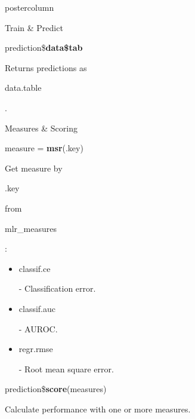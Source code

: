 \documentclass{beamer}
\newcommand{\codeinline}[1]{\begin{codeboxinline}#1\end{codeboxinline}}
\begin{document}
\begin{frame}[fragile]{}
\begin{columns}
\begin{column}{.245\textwidth}
\begin{beamercolorbox}[center]{postercolumn}
\begin{minipage}{.98\textwidth}
{\begin{myblock}{Train \& Predict}
							\begin{codebox}
								prediction\$\textbf{data\$tab}
							\end{codebox}
							Returns predictions as \codeinline{data.table}.
	                    \end{myblock}
	                    \begin{myblock}{Measures \& Scoring}
							\begin{codebox}
								measure = \textbf{msr}(.key)
							\end{codebox}
							Get measure by \codeinline{.key} from \codeinline{mlr\_measures}:
							\begin{itemize}
								\item \codeinline{classif.ce} - Classification error.
								\item \codeinline{classif.auc} - AUROC.
								\item \codeinline{regr.rmse} - Root mean square error.
							\end{itemize}
							\vspace{1em}
							\begin{codebox}
								prediction\$\textbf{score}(measures)
							\end{codebox}
							Calculate performance with one or more measures.
						\end{myblock}
					\vfill}
				\end{minipage}
			\end{beamercolorbox}
		\end{column}
	\end{columns}
\end{frame}
\end{document}
